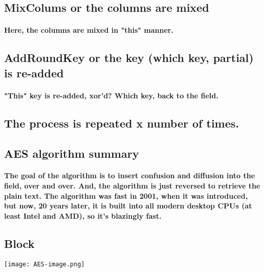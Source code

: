 \subsection{MixColums or the columns are mixed}
\paragraph{Here, the columns are mixed in "this" manner.}

\subsection{AddRoundKey or the key (which key, partial) is re-added}
\paragraph{"This" key is re-added, xor'd? Which key, back to the field.}


\subsection{The process is repeated x number of times.}



\subsection{AES algorithm summary}
\paragraph{The goal of the algorithm is to insert confusion and diffusion into the field, over and over. And, the algorithm is just reversed to retrieve the plain text. The algorithm was fast in 2001, when it was introduced, but now, 20 years later, it is built into all modern desktop CPUs (at least Intel and AMD), so it's blazingly fast.}

\subsection{Block}

\begin{center}
\texttt{[image: AES-image.png]}
\end{center}

